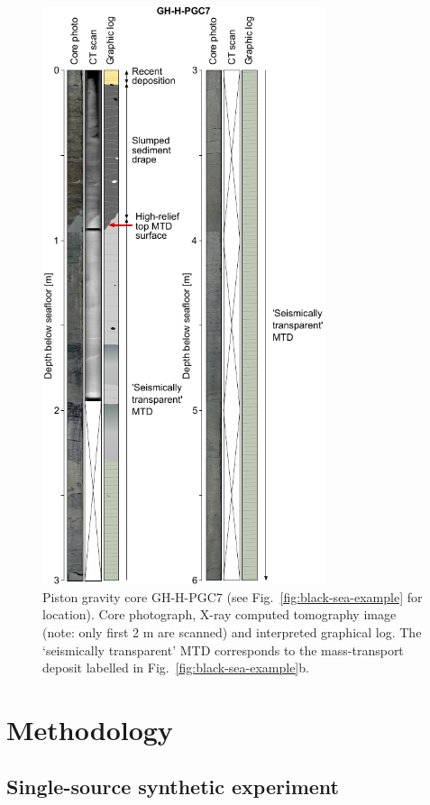 \documentclass[se,manuscript]{copernicus}
\begin{document}
\begin{figure}
    \includegraphics[width=8.3cm]{figures/fig02.pdf}
    \caption{Piston gravity core GH-H-PGC7 (see Fig.~\ref{fig:black-sea-example} for location).
        Core photograph, X-ray computed tomography image (note: only first 2 \unit{m} are scanned) and interpreted graphical log.
        The `seismically transparent' MTD corresponds to the mass-transport deposit labelled in Fig.~\ref{fig:black-sea-example}b.}
    \label{fig:black-sea-core}
\end{figure}

\section{Methodology}

\subsection{Single-source synthetic experiment}
\label{sec:methodology-single}
\end{document}
